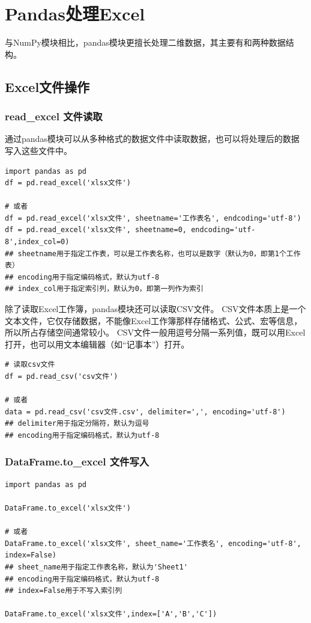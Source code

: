 \chapter{Pandas处理Excel}
与NumPy模块相比，pandas模块更擅长处理二维数据，其主要有和两种数据结构。

\section{Excel文件操作}
\subsection{read\_excel 文件读取}
通过pandas模块可以从多种格式的数据文件中读取数据，也可以将处理后的数据写入这些文件中。
\begin{lstlisting}[style=demostyle,numbers=none]
import pandas as pd
df = pd.read_excel('xlsx文件')

# 或者
df = pd.read_excel('xlsx文件', sheetname='工作表名', endcoding='utf-8')
df = pd.read_excel('xlsx文件', sheetname=0, endcoding='utf-8',index_col=0)
## sheetname用于指定工作表，可以是工作表名称，也可以是数字（默认为0，即第1个工作表）
## encoding用于指定编码格式，默认为utf-8
## index_col用于指定索引列，默认为0，即第一列作为索引
\end{lstlisting}

除了读取Excel工作簿，pandas模块还可以读取CSV文件。
CSV文件本质上是一个文本文件，它仅存储数据，不能像Excel工作簿那样存储格式、公式、宏等信息，
所以所占存储空间通常较小。
CSV文件一般用逗号分隔一系列值，既可以用Excel打开，也可以用文本编辑器（如“记事本”）打开。
\begin{lstlisting}[style=demostyle,numbers=none]
# 读取csv文件
df = pd.read_csv('csv文件')

# 或者
data = pd.read_csv('csv文件.csv', delimiter=',', encoding='utf-8')
## delimiter用于指定分隔符，默认为逗号
## encoding用于指定编码格式，默认为utf-8
\end{lstlisting}

\subsection{DataFrame.to\_excel 文件写入}
\begin{lstlisting}[style=demostyle,numbers=none]
import pandas as pd   

DataFrame.to_excel('xlsx文件')

# 或者
DataFrame.to_excel('xlsx文件', sheet_name='工作表名', encoding='utf-8', index=False)
## sheet_name用于指定工作表名称，默认为'Sheet1'
## encoding用于指定编码格式，默认为utf-8
## index=False用于不写入索引列

DataFrame.to_excel('xlsx文件',index=['A','B','C'])
\end{lstlisting}        

